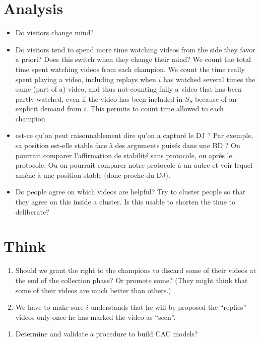 \documentclass[version=3.21, pagesize, twoside=off, bibliography=totoc, DIV=calc, fontsize=12pt, a4paper]{scrartcl}
\begin{document}
\section{Analysis}
\begin{itemize}
	\item Do visitors change mind?
	\item Do visitors tend to spend more time watching videos from the side they favor a priori? Does this switch when they change their mind? We count the total time spent watching videos from each champion. We count the time really spent playing a video, including replays when $i$ has watched several times the same (part of a) video, and thus not counting fully a video that has been partly watched, even if the video has been included in $S_S$ because of an explicit demand from $i$. This permits to count time allowed to each champion.
	\item {} est-ce qu’on peut raisonnablement dire qu’on a capturé le DJ ? Par exemple, sa position est-elle stable face à des arguments puisés dans une BD ? On pourrait comparer l’affirmation de stabilité sans protocole, ou après le protocole. Ou on pourrait comparer notre protocole à un autre et voir lequel amène à une position stable (donc proche du DJ).
	\item Do people agree on which videos are helpful? Try to cluster people so that they agree on this inside a cluster. Is this usable to shorten the time to deliberate?
\end{itemize}

\section{Think}
\begin{enumerate}
	\item Should we grant the right to the champions to discard some of their videos at the end of the collection phase? Or promote some? (They might think that some of their videos are much better than others.)
	\item We have to make sure $i$ understands that he will be proposed the “replies” videos only once he has marked the video as “seen”.
\end{enumerate}

\begin{enumerate}
	\item Determine and validate a procedure to build CAC models?
\end{enumerate}
\end{document}
